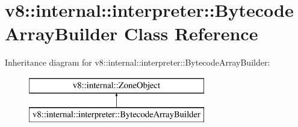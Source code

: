\hypertarget{classv8_1_1internal_1_1interpreter_1_1_bytecode_array_builder}{}\section{v8\+:\+:internal\+:\+:interpreter\+:\+:Bytecode\+Array\+Builder Class Reference}
\label{classv8_1_1internal_1_1interpreter_1_1_bytecode_array_builder}
Inheritance diagram for v8\+:\+:internal\+:\+:interpreter\+:\+:Bytecode\+Array\+Builder\+:\begin{figure}[H]
\begin{center}
\leavevmode
\includegraphics[height=2.000000cm]{classv8_1_1internal_1_1interpreter_1_1_bytecode_array_builder}
\end{center}
\end{figure}
